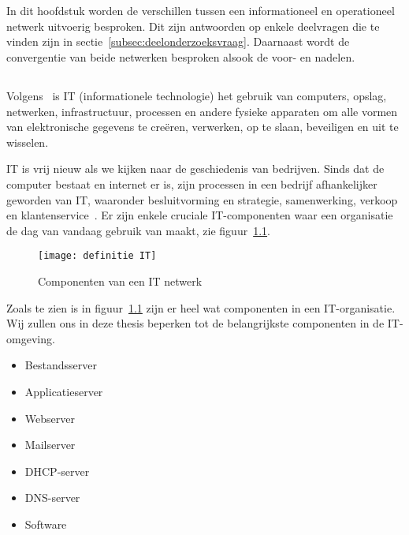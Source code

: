 
\chapter{}
\label{ch:stand-van-zaken}
In dit hoofdstuk worden de verschillen tussen een informationeel en operationeel netwerk uitvoerig besproken. Dit zijn antwoorden op enkele deelvragen die te vinden zijn in sectie~\ref{subsec:deelonderzoeksvraag}. Daarnaast wordt de convergentie van beide netwerken besproken alsook de voor- en nadelen.
\section{}
\label{sec:Informatie technologie}
\subsection{}
\label{subsec:Definitie Informatie technologie}
Volgens~\textcite{Castagna2021} is IT (informationele technologie) het gebruik van computers, opslag, netwerken, infrastructuur, processen en andere fysieke apparaten om alle vormen van elektronische gegevens te creëren, verwerken, op te slaan, beveiligen en uit te wisselen. 

IT is vrij nieuw als we kijken naar de geschiedenis van bedrijven. Sinds dat de computer bestaat en internet er is, zijn processen in een bedrijf afhankelijker geworden van IT, waaronder besluitvorming en strategie, samenwerking, verkoop en klantenservice~\autocite{SecureiconTeam2019}. Er zijn enkele cruciale IT-componenten waar een organisatie de dag van vandaag gebruik van maakt, zie figuur~\ref{fig:2.1}.


\begin{figure}
    \texttt{[image: definitie IT]}
    \caption{Componenten van een IT netwerk\autocite{Castagna2021} \label{fig:2.1}} 
\end{figure}

Zoals te zien is in figuur~\ref{fig:2.1} zijn er heel wat componenten in een IT-organisatie. Wij zullen ons in deze thesis beperken tot de belangrijkste componenten in de IT-omgeving. 
\begin{itemize}
    \item Bestandsserver
    \item Applicatieserver
    \item Webserver
    \item Mailserver
    \item DHCP-server
    \item DNS-server
    \item Software
\end{itemize}
